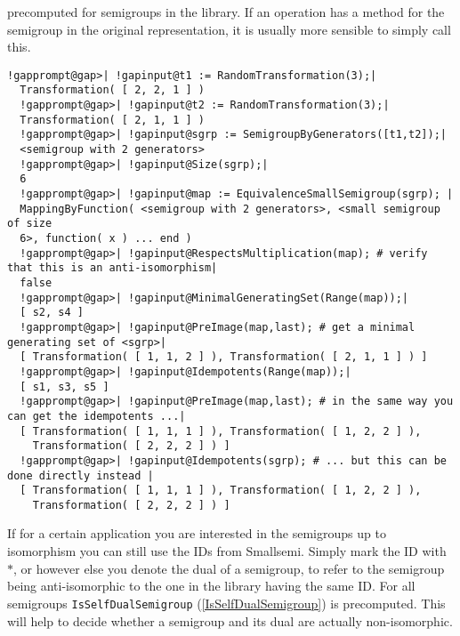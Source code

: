 \documentclass[a4paper,11pt]{report}
\begin{document}
{{precomputed for semigroups in the library. If an operation has a method for
the semigroup in the original representation, it is usually more sensible to
simply call this. 
\begin{Verbatim}[commandchars=!@|,fontsize=\small,frame=single,label=Example]
  !gapprompt@gap>| !gapinput@t1 := RandomTransformation(3);|
  Transformation( [ 2, 2, 1 ] )
  !gapprompt@gap>| !gapinput@t2 := RandomTransformation(3);|
  Transformation( [ 2, 1, 1 ] )
  !gapprompt@gap>| !gapinput@sgrp := SemigroupByGenerators([t1,t2]);|
  <semigroup with 2 generators>
  !gapprompt@gap>| !gapinput@Size(sgrp);|
  6
  !gapprompt@gap>| !gapinput@map := EquivalenceSmallSemigroup(sgrp); |
  MappingByFunction( <semigroup with 2 generators>, <small semigroup of size 
  6>, function( x ) ... end )
  !gapprompt@gap>| !gapinput@RespectsMultiplication(map); # verify that this is an anti-isomorphism|
  false
  !gapprompt@gap>| !gapinput@MinimalGeneratingSet(Range(map));|
  [ s2, s4 ]
  !gapprompt@gap>| !gapinput@PreImage(map,last); # get a minimal generating set of <sgrp>|
  [ Transformation( [ 1, 1, 2 ] ), Transformation( [ 2, 1, 1 ] ) ]
  !gapprompt@gap>| !gapinput@Idempotents(Range(map));|
  [ s1, s3, s5 ]
  !gapprompt@gap>| !gapinput@PreImage(map,last); # in the same way you can get the idempotents ...|
  [ Transformation( [ 1, 1, 1 ] ), Transformation( [ 1, 2, 2 ] ), 
    Transformation( [ 2, 2, 2 ] ) ]
  !gapprompt@gap>| !gapinput@Idempotents(sgrp); # ... but this can be done directly instead |
  [ Transformation( [ 1, 1, 1 ] ), Transformation( [ 1, 2, 2 ] ), 
    Transformation( [ 2, 2, 2 ] ) ]
\end{Verbatim}
 If for a certain application you are interested in the semigroups up to
isomorphism you can still use the IDs from \textsf{Smallsemi}. Simply mark the ID with $*$, or however else you denote the dual of a semigroup, to refer to the
semigroup being anti-isomorphic to the one in the library having the same ID.
For all semigroups \texttt{IsSelfDualSemigroup} (\ref{IsSelfDualSemigroup}) is precomputed. This will help to decide whether a semigroup and its dual are
actually non-isomorphic. }

  }

  
\end{document}
